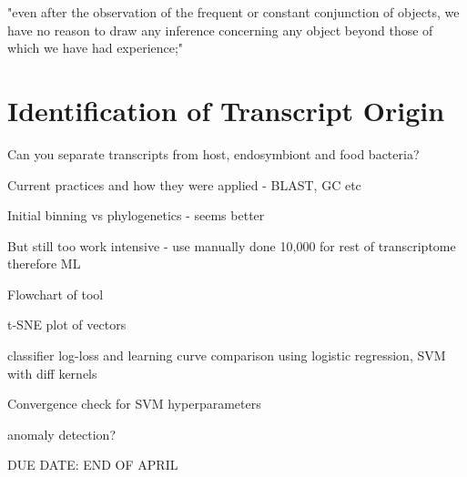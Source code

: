 \graphicspath{{chapters/4.Chapter_2/figures}}

\begin{savequote}[75mm]
"even after the observation of the frequent or constant conjunction of objects, we have no reason to draw any inference concerning any object beyond those of which we have had experience;"
\end{savequote}

\chapter{Identification of Transcript Origin}

Can you separate transcripts from host, endosymbiont and food bacteria?

Current practices and how they were applied - BLAST, GC etc

Initial binning vs phylogenetics - seems better

But still too work intensive - use manually done 10,000 for rest of transcriptome therefore ML

Flowchart of tool 

t-SNE plot of vectors

classifier log-loss and learning curve comparison using logistic regression, SVM with diff kernels

Convergence check for SVM hyperparameters

anomaly detection?

DUE DATE: END OF APRIL

